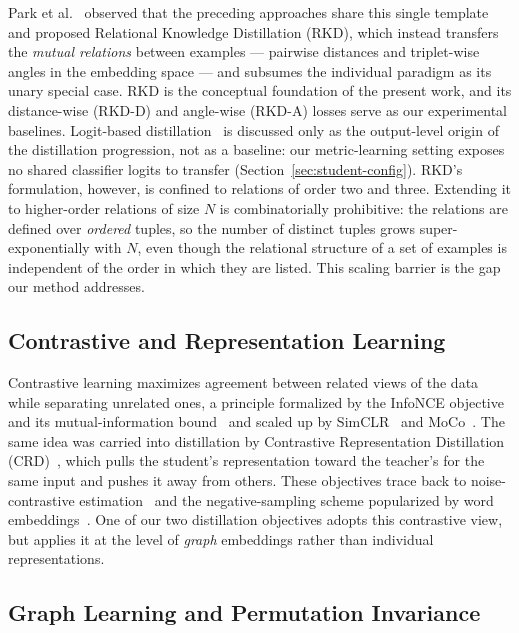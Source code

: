 \documentclass[11pt,letterpaper]{article}
\begin{document}
Park et al.~\cite{park2019relational} observed that the preceding approaches share
this single template and proposed Relational Knowledge Distillation (RKD), which
instead transfers the \emph{mutual relations} between examples --- pairwise
distances and triplet-wise angles in the embedding space --- and subsumes the
individual paradigm as its unary special case. RKD is the conceptual foundation of
the present work, and its distance-wise (RKD-D) and angle-wise (RKD-A) losses serve
as our experimental baselines. Logit-based
distillation~\cite{hinton2015distilling} is discussed only as the output-level
origin of the distillation progression, not as a baseline: our metric-learning
setting exposes no shared classifier logits to transfer (Section~\ref{sec:student-config}).
RKD's formulation, however, is confined to relations of order two and
three. Extending it to higher-order relations of size $N$ is combinatorially
prohibitive: the relations are defined over \emph{ordered} tuples, so the number of
distinct tuples grows super-exponentially with $N$, even though the relational
structure of a set of examples is independent of the order in which they are listed.
This scaling barrier is the gap our method addresses.

\subsection{Contrastive and Representation Learning}
\label{sec:related-contrastive}

Contrastive learning maximizes agreement between related views of the data while
separating unrelated ones, a principle formalized by the InfoNCE objective and its
mutual-information bound~\cite{oord2018cpc} and scaled up by
SimCLR~\cite{chen2020simclr} and MoCo~\cite{he2020moco}. The same idea was carried
into distillation by Contrastive Representation Distillation
(CRD)~\cite{tian2020crd}, which pulls the student's representation toward the
teacher's for the same input and pushes it away from others. These objectives trace
back to noise-contrastive estimation~\cite{gutmann2010nce} and the negative-sampling
scheme popularized by word embeddings~\cite{mikolov2013word2vec}. One of our two
distillation objectives adopts this contrastive view, but applies it at the level of
\emph{graph} embeddings rather than individual representations.

\subsection{Graph Learning and Permutation Invariance}
\label{sec:related-graph}
\end{document}
